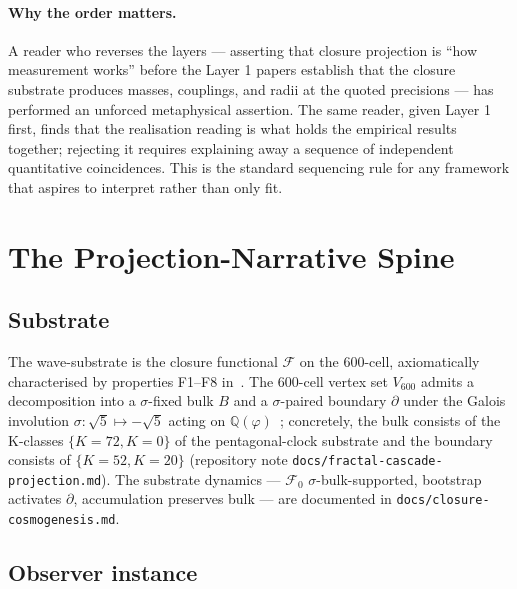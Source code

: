 \documentclass[12pt]{article}
\newcommand{\Fcal}{\mathcal{F}}
\begin{document}
\paragraph{Why the order matters.}
A reader who reverses the layers --- asserting that closure projection is ``how measurement works'' before the Layer 1 papers establish that the closure substrate produces masses, couplings, and radii at the quoted precisions --- has performed an unforced metaphysical assertion. The same reader, given Layer 1 first, finds that the realisation reading is what holds the empirical results together; rejecting it requires explaining away a sequence of independent quantitative coincidences. This is the standard sequencing rule for any framework that aspires to interpret rather than only fit.

\section{The Projection-Narrative Spine}\label{sec:spine}

\subsection{Substrate}

The wave-substrate is the closure functional $\Fcal$ on the 600-cell, axiomatically characterised by properties F1--F8 in~\citep{SmartXXXVI}. The 600-cell vertex set $V_{600}$ admits a decomposition into a $\sigma$-fixed bulk $B$ and a $\sigma$-paired boundary $\partial$ under the Galois involution $\sigma : \sqrt 5 \mapsto -\sqrt 5$ acting on $\mathbb{Q}(\varphi)$~\citep{SmartXXII}; concretely, the bulk consists of the K-classes $\{K = 72, K = 0\}$ of the pentagonal-clock substrate and the boundary consists of $\{K = 52, K = 20\}$ (repository note \texttt{docs/fractal-cascade-projection.md}). The substrate dynamics --- $\Fcal_0$ $\sigma$-bulk-supported, bootstrap activates $\partial$, accumulation preserves bulk --- are documented in \texttt{docs/closure-cosmogenesis.md}.

\subsection{Observer instance}
\end{document}

